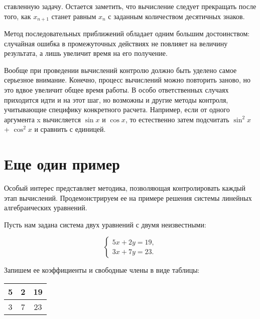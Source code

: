 \twocolumn
\par \noindent ставленную задачу. Остается заметить, что вычисление следует прекращать после того, как $x_{n+1}$ станет равным $x_{n}$ с заданным количеством десятичных знаков.

\par Метод последовательных приближений обладает одним большим достоинством: случайная ошибка в промежуточных действиях не повлияет на величину результата, а лишь увеличит время на его получение.


\par Вообще при проведении вычислений контролю должно быть уделено самое серьезное внимание. Конечно, процесс вычислений можно повторить заново, но это вдвое увеличит общее время работы. В особо ответственных случаях приходится идти и на этот шаг, но возможны и другие методы контроля, учитывающие специфику конкретного расчета. Например, если от одного аргумента x вычисляется $\sin x$ и $\cos x$, то естественно затем подсчитать $\sin^{2}x$ + $\cos^{2}x$ и сравнить с единицей.


\section*{Еще один пример}

\par \noindent Особый интерес представляет методика, позволяющая контролировать каждый этап вычислений. Продемонстрируем ее на примере решения системы линейных алгебраических уравнений.

\par Пусть нам задана система двух уравнений с двумя неизвестными:

    \begin{equation} \tag{4}
     \begin{cases}
       5x + 2y= 19,\\
       3x + 7y = 23.
     \end{cases}
    \end{equation}
    
\par Запишем ее коэффициенты и свободные члены в виде таблицы:

    \begin{center}
        \begin{tabular}{|c|c|c|}
            5 & 2 & 19\\
            \hline
            3 & 7 & 23\\
        \end{tabular}
    \end{center}

